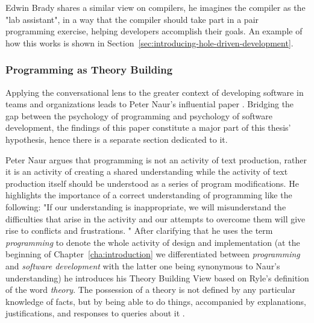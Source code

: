 Edwin Brady shares a similar view on compilers, he imagines the compiler as the "lab assistant", in a way that the compiler should take part in a pair programming exercise, helping developers accomplish their goals.
An example of how this works is shown in Section~\ref{sec:introducing-hole-driven-development}.


\subsubsection{Programming as Theory Building}
\label{sec:programming-as-theory-building}
Applying the conversational lens to the greater context of developing software in teams and organizations leads to Peter Naur's influential paper .
Bridging the gap between the psychology of programming and psychology of software development, the findings of this paper constitute a major part of this thesis' hypothesis, hence there is a separate section dedicated to it.

Peter Naur argues that programming is not an activity of text production, rather it is an activity of creating a shared understanding while the activity of text production itself should be understood as a series of program modifications.
He highlights the importance of a correct understanding of programming like the following: "If our understanding is inappropriate, we will misunderstand the difficulties that arise in the activity and our attempts to overcome them will give rise to conflicts and frustrations. \cite{naur_programming_1985}"
After clarifying that he uses the term \emph{programming} to denote the whole activity of design and implementation (at the beginning of Chapter~\ref{cha:introduction} we differentiated between \emph{programming} and \emph{software development} with the latter one being synonymous to Naur's understanding) he introduces his Theory Building View based on Ryle's definition of the word \emph{theory}\addref.
The possession of a theory is not defined by any particular knowledge of facts, but by being able to do things, accompanied by explanations, justifications, and responses to queries about it \cite{barn_revisiting_2011}.

